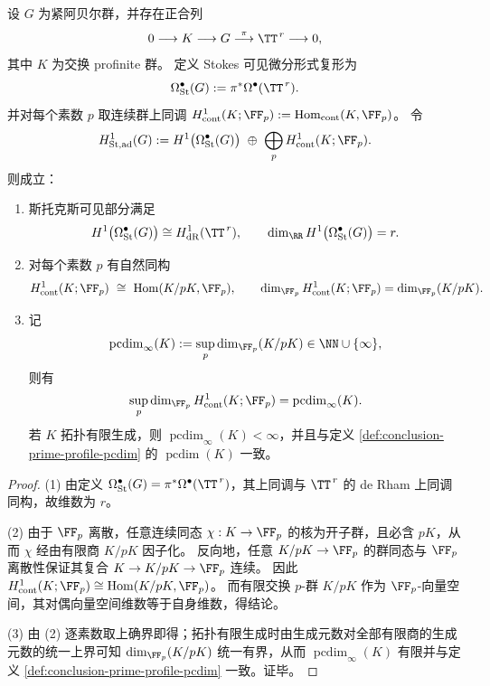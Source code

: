 \begin{theorem}\label{thm:conclusion-adelic-stokes-h1-recovers-cdim-prime-profile}
设 \(G\) 为紧阿贝尔群，并存在正合列
\[
0\longrightarrow K\longrightarrow G\overset{\pi}{\longrightarrow}\TT^{\,r}\longrightarrow 0,
\]
其中 \(K\) 为交换 profinite 群。
定义 Stokes 可见微分形式复形为
\[
\Omega^\bullet_{\mathrm{St}}(G):=\pi^\ast\Omega^\bullet(\TT^{\,r}).
\]
并对每个素数 \(p\) 取连续群上同调
\(
H^1_{\mathrm{cont}}(K;\FF_p)
:=\mathrm{Hom}_{\mathrm{cont}}(K,\FF_p)
\)。
令
\[
H^1_{\mathrm{St,ad}}(G):=
H^1\bigl(\Omega^\bullet_{\mathrm{St}}(G)\bigr)\ \oplus\ \bigoplus_{p} H^1_{\mathrm{cont}}(K;\FF_p).
\]
则成立：
\begin{enumerate}
  \item 斯托克斯可见部分满足
  \[
  H^1\bigl(\Omega^\bullet_{\mathrm{St}}(G)\bigr)\cong H^1_{\mathrm{dR}}(\TT^{\,r}),
  \qquad
  \dim_{\RR}H^1\bigl(\Omega^\bullet_{\mathrm{St}}(G)\bigr)=r.
  \]
  \item 对每个素数 \(p\) 有自然同构
  \[
  H^1_{\mathrm{cont}}(K;\FF_p)\ \cong\ \mathrm{Hom}(K/pK,\FF_p),
  \qquad
  \dim_{\FF_p}H^1_{\mathrm{cont}}(K;\FF_p)=\dim_{\FF_p}(K/pK).
  \]
  \item 记
  \[
  \operatorname{pcdim}_\infty(K):=\sup_{p}\dim_{\FF_p}(K/pK)\in\NN\cup\{\infty\},
  \]
  则有
  \[
  \sup_{p}\dim_{\FF_p}H^1_{\mathrm{cont}}(K;\FF_p)=\operatorname{pcdim}_\infty(K).
  \]
  若 \(K\) 拓扑有限生成，则 \(\operatorname{pcdim}_\infty(K)<\infty\)，并且与定义 \ref{def:conclusion-prime-profile-pcdim} 的 \(\operatorname{pcdim}(K)\) 一致。
\end{enumerate}
\end{theorem}
\begin{proof}
(1) 由定义 \(\Omega^\bullet_{\mathrm{St}}(G)=\pi^\ast\Omega^\bullet(\TT^{\,r})\)，其上同调与 \(\TT^{\,r}\) 的 de Rham 上同调同构，故维数为 \(r\)。
\par
(2) 由于 \(\FF_p\) 离散，任意连续同态 \(\chi:K\to\FF_p\) 的核为开子群，且必含 \(pK\)，从而 \(\chi\) 经由有限商 \(K/pK\) 因子化。
反向地，任意 \(K/pK\to\FF_p\) 的群同态与 \(\FF_p\) 离散性保证其复合 \(K\to K/pK\to\FF_p\) 连续。
因此 \(H^1_{\mathrm{cont}}(K;\FF_p)\cong \mathrm{Hom}(K/pK,\FF_p)\)。
而有限交换 \(p\)-群 \(K/pK\) 作为 \(\FF_p\)-向量空间，其对偶向量空间维数等于自身维数，得结论。
\par
(3) 由 (2) 逐素数取上确界即得；拓扑有限生成时由生成元数对全部有限商的生成元数的统一上界可知 \(\dim_{\FF_p}(K/pK)\) 统一有界，从而 \(\operatorname{pcdim}_\infty(K)\) 有限并与定义 \ref{def:conclusion-prime-profile-pcdim} 一致。证毕。
\end{proof}

